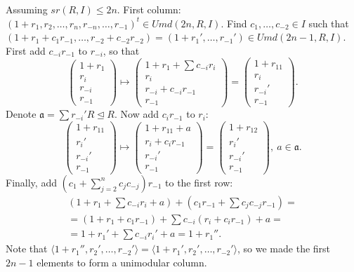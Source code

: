 Assuming $sr(R,I)\leqslant 2n$.
First column: $(1+r_1,r_2,\ldots,r_n,r_{-n},\ldots,r_{-1})^t\in Umd(2n,R,I)$. Find $c_1,\ldots,c_{-2}\in I$ such that $(1+r_1+c_1r_{-1},\ldots,r_{-2}+c_{-2}r_{-2})=(1+r_1',\ldots,r_{-1}')\in Umd(2n-1,R,I)$. First add $c_{-i}r_{-1}$ to $r_{-i}$, so that
\[
\begin{pmatrix}
1+r_1 \\ r_i \\ r_{-i} \\ r_{-1}
\end{pmatrix}
\mapsto
\begin{pmatrix}
1+r_1+\sum c_{-i}r_i\\ r_i \\ r_{-i}+c_{-i}r_{-1} \\ r_{-1}
\end{pmatrix}=
\begin{pmatrix}
1+r_{11} \\ r_i \\ r_{-i}' \\ r_{-1}
\end{pmatrix}.
\]
Denote $\mathfrak{a}=\sum r_{-i}'R\unlhd R$. Now add $c_ir_{-1}$ to $r_i$:
\[
\begin{pmatrix}
1+r_{11} \\ r_i' \\ r_{-i}' \\ r_{-1}
\end{pmatrix}
\mapsto
\begin{pmatrix}
1+r_{11}+a \\ r_i+c_ir_{-1} \\ r_{-i}' \\ r_{-1}
\end{pmatrix}=
\begin{pmatrix}
1+r_{12} \\ r_i' \\ r_{-i}' \\ r_{-1}
\end{pmatrix},
\ a\in\mathfrak{a}.
\]
Finally, add $\left(c_1+\sum_{j=2}^n c_jc_{-j}\right)r_{-1}$ to the first row:
\begin{multline*}
\left(1+r_1+\sum c_{-i}r_i+a\right)+\left(c_1r_{-1}+\sum c_jc_{-j}r_{-1}\right)=\\
=(1+r_1+c_1r_{-1})+\sum c_{-i}(r_i+c_ir_{-1})+a=\\
=1+r_1'+\sum c_{-i}r_i'+a=1+r_1''.
\end{multline*}
Note that $\langle 1+r_1'',r_2',\ldots,r_{-2}'\rangle=\langle 1+r_1',r_2',\ldots,r_{-2}'\rangle$, so we made the first $2n-1$ elements to form a unimodular column.

